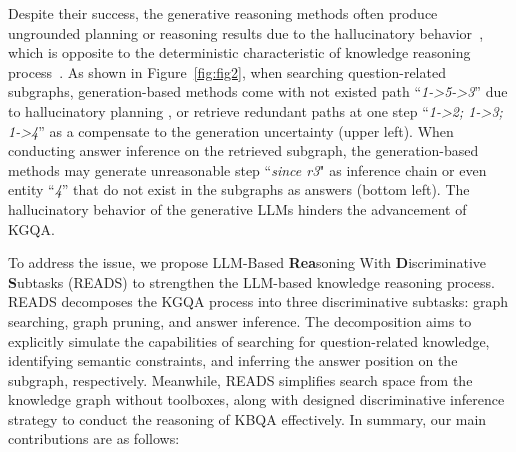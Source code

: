 \documentclass[11pt]{article}
\begin{document}
Despite their success, the generative reasoning methods often produce ungrounded planning or reasoning results due to the hallucinatory behavior~\cite{zhang2023siren,sun2024head,pan2024unifying}, which is opposite to the deterministic characteristic of knowledge reasoning process~\cite{garcez2015neural,xiong2024converging}. 
As shown in Figure~\ref{fig:fig2}, when searching question-related subgraphs, generation-based methods come with not existed path ``\textit{1->5->3}” due to hallucinatory planning , or retrieve redundant paths at one step ``\textit{1->2; 1->3; 1->4}” as a compensate to the generation uncertainty (upper left). 
When conducting answer inference on the retrieved subgraph, the generation-based methods may generate unreasonable step ``\textit{since r3}" as inference chain or even entity ``\textit{4}” that do not exist in the subgraphs as answers (bottom left).
The hallucinatory behavior of the generative LLMs hinders the advancement of KGQA. 

To address the issue, we propose LLM-Based \textbf{Rea}soning With \textbf{D}iscriminative \textbf{S}ubtasks (READS) to strengthen the LLM-based knowledge reasoning process.
READS decomposes the KGQA process into three discriminative subtasks: graph searching, graph pruning, and answer inference. The decomposition aims to explicitly simulate the capabilities of searching for question-related knowledge, identifying semantic constraints, and inferring the answer position on the subgraph, respectively.
Meanwhile, READS simplifies search space from the knowledge graph without toolboxes, along with designed discriminative inference strategy to conduct the reasoning of KBQA effectively.
In summary, our main contributions are as follows:
\end{document}
